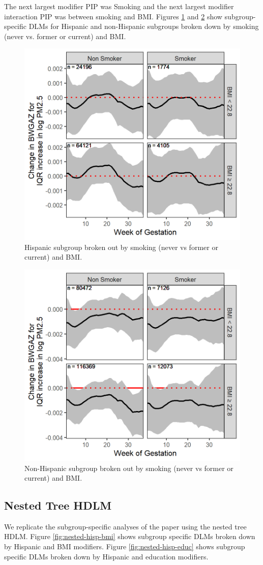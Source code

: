 \documentclass[12pt]{article}
\begin{document}
The next largest modifier PIP was Smoking and the next largest modifier interaction PIP was between smoking and BMI. Figures \ref{fig:hisp-smk-bmi} and \ref{fig:nonhisp-smk-bmi} show subgroup-specific DLMs for Hispanic and non-Hispanic subgroups broken down by smoking (never vs. former or current) and BMI.
\begin{figure}[!ht]
    \centering
    \includegraphics[width=.5\textwidth]{supp-img/hisp_smk_bmi.png}
    \caption{Hispanic subgroup broken out by smoking (never vs former or current) and BMI.}
    \label{fig:hisp-smk-bmi}
\end{figure}
\begin{figure}[!ht]
    \centering
    \includegraphics[width=.5\textwidth]{supp-img/nonhisp_smk_bmi.png}
    \caption{Non-Hispanic subgroup broken out by smoking (never vs former or current) and BMI.}
    \label{fig:nonhisp-smk-bmi}
\end{figure}
\clearpage


\subsection{Nested Tree HDLM}
We replicate the subgroup-specific analyses of the paper using the nested tree HDLM. Figure \ref{fig:nested-hisp-bmi} shows subgroup specific DLMs broken down by Hispanic and BMI modifiers. Figure \ref{fig:nested-hisp-educ} shows subgroup specific DLMs broken down by Hispanic and education modifiers. 
\end{document}
